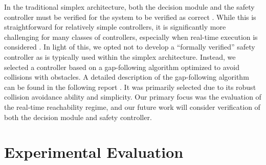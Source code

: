 \documentclass[manuscript,screen,review]{acmart}
\newcommand{\todo}[1]{\textcolor{red}{\textbf{\underline{TODO:}} #1}}
\begin{document}

In the traditional simplex architecture, both the decision module and the safety controller must be verified for the system to be verified as correct \cite{Mehmood2021}. While this is straightforward for relatively simple controllers, it is significantly more challenging for many classes of controllers, especially when real-time execution is considered \cite{ivanov2020case}. In light of this, we opted not to develop a ``formally verified'' safety controller as is typically used within the simplex architecture. Instead, we selected a controller based on a gap-following algorithm optimized to avoid collisions with obstacles. A detailed description of the gap-following algorithm can be found in the following report \cite{otterness_2019}. It was primarily selected due to its robust collision avoidance ability and simplicity. Our primary focus was the evaluation of the real-time reachability regime, and our future work will consider verification of both the decision module and safety controller. 


\section{Experimental Evaluation}
\label{sec:experiments}

\end{document}
